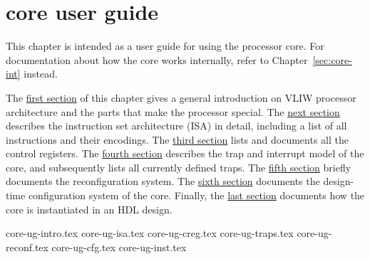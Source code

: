 \chapter{\rvex{} core user guide}
\label{sec:core-ug}

This chapter is intended as a user guide for using the \rvex{} processor core.
For documentation about how the core works internally, refer to
Chapter~\ref{sec:core-int} instead.

The \hyperref[sec:core-ug-intro]{first section} of this chapter gives a general 
introduction on VLIW processor architecture and the parts that make the \rvex{} 
processor special. The \hyperref[sec:core-ug-isa]{next section} describes the 
instruction set architecture (ISA) in detail, including a list of all 
instructions and their encodings. The \hyperref[sec:core-ug-creg]{third section} 
lists and documents all the control registers. The 
\hyperref[sec:core-ug-traps]{fourth section} describes the trap and interrupt 
model of the core, and subsequently lists all currently defined traps. The 
\hyperref[sec:core-ug-reconf]{fifth section} briefly documents the 
reconfiguration system. The \hyperref[sec:core-ug-cfg]{sixth section} documents 
the design-time configuration system of the core. Finally, the 
\hyperref[sec:core-ug-inst]{last section} documents how the core is instantiated 
in an HDL design.

{core-ug-intro.tex}
{core-ug-isa.tex}
{core-ug-creg.tex}
{core-ug-traps.tex}
{core-ug-reconf.tex}
{core-ug-cfg.tex}
{core-ug-inst.tex}
